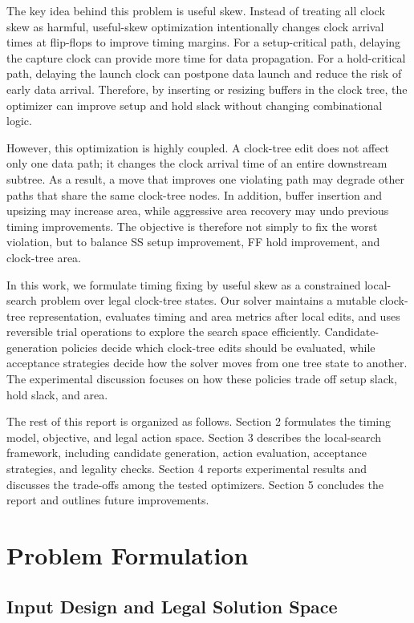 \documentclass{article}
\begin{document}
The key idea behind this problem is useful skew. Instead of treating all clock skew as harmful, useful-skew optimization intentionally changes clock arrival times at flip-flops to improve timing margins. For a setup-critical path, delaying the capture clock can provide more time for data propagation. For a hold-critical path, delaying the launch clock can postpone data launch and reduce the risk of early data arrival. Therefore, by inserting or resizing buffers in the clock tree, the optimizer can improve setup and hold slack without changing combinational logic.

However, this optimization is highly coupled. A clock-tree edit does not affect only one data path; it changes the clock arrival time of an entire downstream subtree. As a result, a move that improves one violating path may degrade other paths that share the same clock-tree nodes. In addition, buffer insertion and upsizing may increase area, while aggressive area recovery may undo previous timing improvements. The objective is therefore not simply to fix the worst violation, but to balance SS setup improvement, FF hold improvement, and clock-tree area.

In this work, we formulate timing fixing by useful skew as a constrained local-search problem over legal clock-tree states. Our solver maintains a mutable clock-tree representation, evaluates timing and area metrics after local edits, and uses reversible trial operations to explore the search space efficiently. Candidate-generation policies decide which clock-tree edits should be evaluated, while acceptance strategies decide how the solver moves from one tree state to another. The experimental discussion focuses on how these policies trade off setup slack, hold slack, and area.

The rest of this report is organized as follows. Section 2 formulates the timing model, objective, and legal action space. Section 3 describes the local-search framework, including candidate generation, action evaluation, acceptance strategies, and legality checks. Section 4 reports experimental results and discusses the trade-offs among the tested optimizers. Section 5 concludes the report and outlines future improvements.


\section{Problem Formulation}

\subsection{Input Design and Legal Solution Space}
\end{document}
